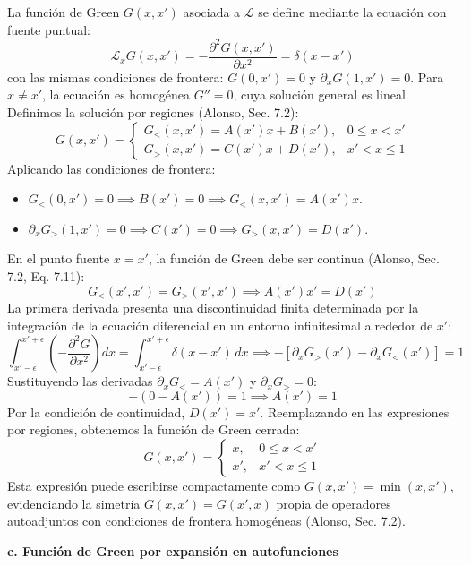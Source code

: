 \documentclass[a4paper]{article}
\begin{document}
La función de Green $G(x, x')$ asociada a $\mathscr{L}$ se define mediante la ecuación con fuente puntual:
$$ \mathscr{L}_x G(x, x') = -\frac{\partial^2 G(x, x')}{\partial x^2} = \delta(x - x') $$
con las mismas condiciones de frontera: $G(0, x') = 0$ y $\partial_x G(1, x') = 0$. Para $x \neq x'$, la ecuación es homogénea $G'' = 0$, cuya solución general es lineal. Definimos la solución por regiones (Alonso, Sec. 7.2):
$$ G(x, x') = \begin{cases} G_<(x, x') = A(x') x + B(x'), & 0 \le x < x' \\ G_>(x, x') = C(x') x + D(x'), & x' < x \le 1 \end{cases} $$
Aplicando las condiciones de frontera:
\begin{itemize}
\item $G_<(0, x') = 0 \implies B(x') = 0 \implies G_<(x, x') = A(x') x$.
\item $\partial_x G_>(1, x') = 0 \implies C(x') = 0 \implies G_>(x, x') = D(x')$.
\end{itemize}
En el punto fuente $x = x'$, la función de Green debe ser continua (Alonso, Sec. 7.2, Eq. 7.11):
$$ G_<(x', x') = G_>(x', x') \implies A(x') x' = D(x') $$
La primera derivada presenta una discontinuidad finita determinada por la integración de la ecuación diferencial en un entorno infinitesimal alrededor de $x'$:
$$ \int_{x'-\epsilon}^{x'+\epsilon} \left( -\frac{\partial^2 G}{\partial x^2} \right) dx = \int_{x'-\epsilon}^{x'+\epsilon} \delta(x-x') \, dx \implies -\left[ \partial_x G_>(x') - \partial_x G_<(x') \right] = 1 $$
Sustituyendo las derivadas $\partial_x G_< = A(x')$ y $\partial_x G_> = 0$:
$$ -(0 - A(x')) = 1 \implies A(x') = 1 $$
Por la condición de continuidad, $D(x') = x'$. Reemplazando en las expresiones por regiones, obtenemos la función de Green cerrada:
$$ G(x, x') = \begin{cases} x, & 0 \le x < x' \\ x', & x' < x \le 1 \end{cases} $$
Esta expresión puede escribirse compactamente como $G(x, x') = \min(x, x')$, evidenciando la simetría $G(x, x') = G(x', x)$ propia de operadores autoadjuntos con condiciones de frontera homogéneas (Alonso, Sec. 7.2).

\textbf{c. Función de Green por expansión en autofunciones}
\end{document}
